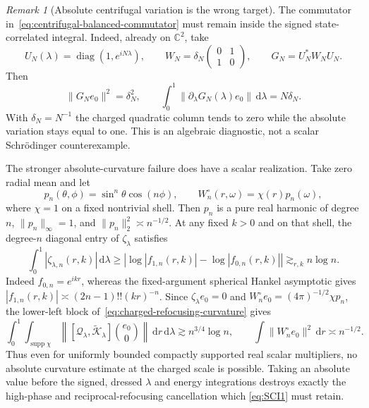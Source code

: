 \documentclass[11pt]{article}
\newcommand{\dd}{\,\mathrm d}
\theoremstyle{definition}
\theoremstyle{remark}
\newtheorem{remark}[theorem]{Remark}
\begin{document}
\begin{remark}[Absolute centrifugal variation is the wrong target]
\label{rem:absolute-centrifugal-variation-false}
The commutator in~\eqref{eq:centrifugal-balanced-commutator} must remain inside
the signed state-correlated integral.  Indeed, already on $\mathbb C^2$, take
\begin{equation}
 U_N(\lambda)=\operatorname{diag}(1,e^{iN\lambda}),
 \qquad
 W_N=\delta_N
 \begin{pmatrix}0&1\\1&0\end{pmatrix},
 \qquad G_N=U_N^*W_NU_N.
\end{equation}
Then
\begin{equation}
 \|G_Ne_0\|^2=\delta_N^2,
 \qquad
 \int_0^1\|\partial_\lambda G_N(\lambda)e_0\|\dd\lambda
 =N\delta_N.
\end{equation}
With $\delta_N=N^{-1}$ the charged quadratic column tends to zero while the
absolute variation stays equal to one.  This is an algebraic diagnostic, not a
scalar Schr\"odinger counterexample.

The stronger absolute-curvature failure does have a scalar realization.  Take
zero radial mean and let
\begin{equation}
 p_n(\theta,\phi)=\sin^n\theta\cos(n\phi),
 \qquad
 W_n^\circ(r,\omega)=\chi(r)p_n(\omega),
 \label{eq:highest-weight-curvature-test}
\end{equation}
where $\chi=1$ on a fixed nontrivial shell.  Then $p_n$ is a pure real harmonic
of degree $n$, $\|p_n\|_\infty=1$, and
$\|p_n\|_2^2\asymp n^{-1/2}$.  At any fixed $k>0$ and on that shell, the
degree-$n$ diagonal entry of $\zeta_\lambda$ satisfies
\begin{equation}
 \int_0^1|\zeta_{\lambda,n}(r,k)|\dd\lambda
 \geq\left|\log|f_{1,n}(r,k)|-\log|f_{0,n}(r,k)|\right|
 \gtrsim_{r,k}n\log n.
 \label{eq:centrifugal-log-amplitude-growth}
\end{equation}
Indeed $f_{0,n}=e^{ikr}$, whereas the fixed-argument spherical Hankel
asymptotic gives
$|f_{1,n}(r,k)|\asymp(2n-1)!!(kr)^{-n}$.  Since
$\zeta_\lambda e_0=0$ and $W_n^\circ e_0=(4\pi)^{-1/2}\chi p_n$, the lower-left
block of~\eqref{eq:charged-refocusing-curvature} gives
\begin{equation}
 \int_0^1\int_{\operatorname{supp}\chi}
 \left\|[\mathcal Q_\lambda,
  \widetilde{\mathcal K}_\lambda]\binom{e_0}{0}\right\|
 \dd r\dd\lambda
 \gtrsim n^{3/4}\log n,
 \qquad
 \int\|W_n^\circ e_0\|^2\dd r\asymp n^{-1/2}.
 \label{eq:absolute-charged-curvature-failure}
\end{equation}
Thus even for uniformly bounded compactly supported real scalar multipliers,
no absolute curvature estimate at the charged scale is possible.  Taking an
absolute value before the signed, dressed $\lambda$ and energy integrations
destroys exactly the high-phase and reciprocal-refocusing cancellation which
\eqref{eq:SCI1} must retain.
\end{remark}
\end{document}
